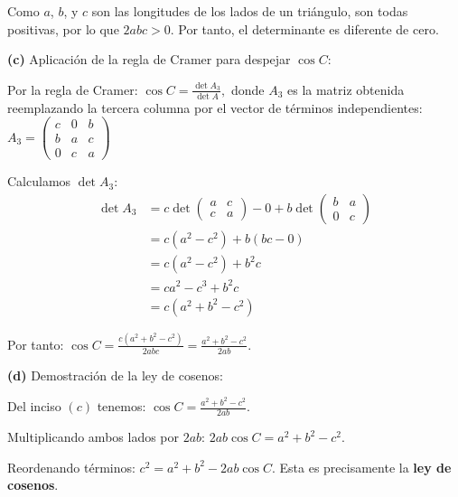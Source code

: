 \begin{prob}
\begin{myproof}
Como $a$, $b$, y $c$ son las longitudes de los lados de un triángulo, son todas positivas, por lo que $2abc > 0$. Por tanto, el determinante es diferente de cero.

\textbf{(c)} Aplicación de la regla de Cramer para despejar $\cos C$:

Por la regla de Cramer: $\cos C = \frac{\det A_3}{\det A},$ donde $A_3$ es la matriz obtenida reemplazando la tercera columna por el vector de términos independientes: $A_3 = \begin{pmatrix}
c & 0 & b \\
b & a & c \\
0 & c & a
\end{pmatrix}$

Calculamos $\det A_3$:
\begin{align*}
\det A_3 &= c \det\begin{pmatrix} a & c \\ c & a \end{pmatrix} - 0 + b \det\begin{pmatrix} b & a \\ 0 & c \end{pmatrix}\\
&= c(a^2 - c^2) + b(bc - 0)\\
&= c(a^2 - c^2) + b^2c\\
&= ca^2 - c^3 + b^2c\\
&= c(a^2 + b^2 - c^2)
\end{align*}

Por tanto: $\cos C = \frac{c(a^2 + b^2 - c^2)}{2abc} = \frac{a^2 + b^2 - c^2}{2ab}.$

\textbf{(d)} Demostración de la ley de cosenos:

Del inciso $(c)$ tenemos: $\cos C = \frac{a^2 + b^2 - c^2}{2ab}.$

Multiplicando ambos lados por $2ab$: $2ab\cos C = a^2 + b^2 - c^2.$

Reordenando términos: $c^2 = a^2 + b^2 - 2ab\cos C.$ Esta es precisamente la \textbf{ley de cosenos}.
\end{myproof}
\end{prob}
 




